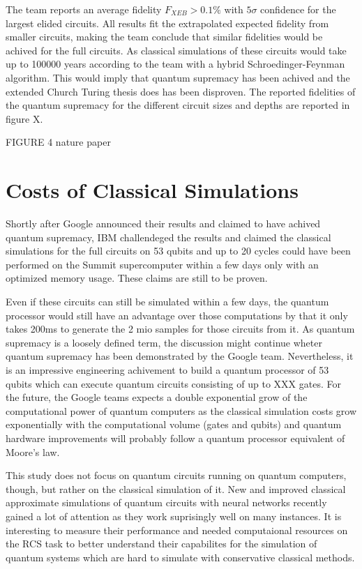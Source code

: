 The team reports an average fidelity $F_{XEB} > 0.1\%$ with $5\sigma$ confidence
for the largest elided circuits. All results fit the extrapolated expected
fidelity from smaller circuits, making the team conclude that similar fidelities
would be achived for the full circuits. As classical simulations of these
circuits would take up to 100000 years according to the team with a hybrid
Schroedinger-Feynman algorithm. This would imply
that quantum supremacy has been achived and the extended Church Turing thesis
does has been disproven. The reported fidelities of the quantum supremacy for
the different circuit sizes and depths are reported in figure X.

FIGURE 4 nature paper

\section{Costs of Classical Simulations}
Shortly after Google announced their results and claimed to have achived quantum
supremacy, IBM challendeged the results and claimed the classical simulations
for the full circuits on 53 qubits and up to 20 cycles could have been performed
on the Summit supercomputer within a few days only with an optimized memory
usage. These claims are still to be proven.

Even if these circuits can still be simulated within a few days, the quantum
processor would still have an advantage over those computations by that it only
takes 200ms to generate the 2 mio samples for those circuits from it. As quantum
supremacy is a loosely defined term, the discussion might continue wheter
quantum supremacy has been demonstrated by the Google team. Nevertheless, it is
an impressive engineering achivement to build a quantum processor of 53 qubits
which can execute quantum circuits consisting of up to XXX gates. For the
future, the Google teams expects a double exponential grow of the computational
power of quantum computers as the classical simulation costs grow exponentially
with the computational volume (gates and qubits) and quantum hardware
improvements will probably follow a quantum processor equivalent of Moore's law.

This study does not focus on quantum circuits running on quantum computers,
though, but rather on the classical simulation of it. New and improved classical
approximate simulations of quantum circuits with neural networks recently gained
a lot of attention as they work suprisingly well on many instances. It is
interesting to measure their performance and needed computaional resources on
the RCS task to better understand their capabilites for the simulation of
quantum systems which are hard to simulate with conservative classical methods.


